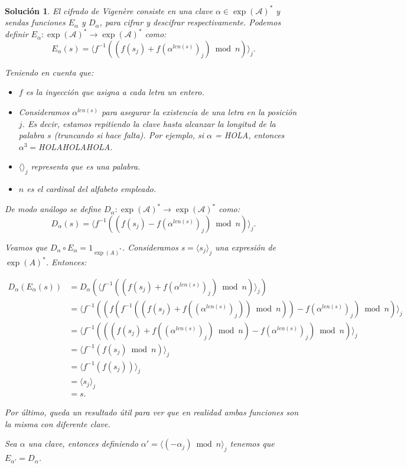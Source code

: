 \documentclass[
  a4paper,
  spanish,
  12pt,
]{scrartcl}
\theoremstyle{ejercicio-style}
\theoremstyle{remark-style}
\newtheorem*{sol}{Solución}
\begin{document}
\begin{sol}
  El cifrado de Vigenère consiste en una clave $\alpha\in \exp (\mathcal{A})^*$ y sendas funciones $E_\alpha$ y $D_\alpha$, para cifrar y descifrar respectivamente. Podemos definir $E_\alpha: \exp (\mathcal{A})^* \to \exp (\mathcal{A})^*$ como:
\[ E_\alpha (s) = \langle f^{-1}( (f(s_j) + f(\alpha^{len(s)})_j) \bmod  n)\rangle _j. \]

  Teniendo en cuenta que:
  \begin{itemize}
  \item $f$ es la inyección que asigna a cada letra un entero.
  \item Consideramos $\alpha^{len(s)}$ para asegurar la existencia de una letra en la posición $j$. Es decir, estamos repitiendo la clave hasta alcanzar la longitud de la palabra $s$ (truncando si hace falta). Por ejemplo, si $\alpha$ = HOLA, entonces $\alpha^3=$HOLAHOLAHOLA.
  \item $\langle \rangle _j$ representa que es una palabra.
  \item $n$ es el cardinal del alfabeto empleado.
  \end{itemize}

  De modo análogo se define $D_\alpha: \exp (\mathcal{A})^* \to \exp (\mathcal{A})^*$ como:
 \[D_\alpha (s) = \langle f^{-1}( (f(s_j) - f(\alpha^{len(s)})_j) \bmod  n)\rangle _j.\]

 Veamos que $D_\alpha \circ E_\alpha = 1_{\exp(A)^*}$. Consideramos $s=\langle s_j \rangle _j$ una expresión de $\exp(A)^*$. Entonces:

\begin{align*}
  D_\alpha(E_\alpha(s)) &= D_\alpha(\langle f^{-1}( (f(s_j) + f(\alpha^{len(s)})_j) \bmod  n)\rangle _j)\\
  &= \langle f^{-1}((f(f^{-1}( (f(s_j) + f((\alpha^{len(s)})_j)) \bmod  n)) - f(\alpha^{len(s)})_j) \bmod  n)\rangle _j\\
  &= \langle f^{-1}(( (f(s_j) + f((\alpha^{len(s)})_j) \bmod  n) - f(\alpha^{len(s)})_j) \bmod  n)\rangle _j\\
  &= \langle f^{-1}(f(s_j)\bmod  n)\rangle _j\\
  &= \langle f^{-1}(f(s_j))\rangle _j\\
  &= \langle s_j\rangle _j\\
  &= s.
\end{align*}


  Por último, queda un resultado útil para ver que en realidad ambas funciones son la misma con diferente clave.

  Sea $\alpha$ una clave, entonces definiendo $\alpha' = \langle (-\alpha_j) \bmod  n \rangle _j$ tenemos que $E_{\alpha'} = D_\alpha$.
\end{sol}
\end{document}
